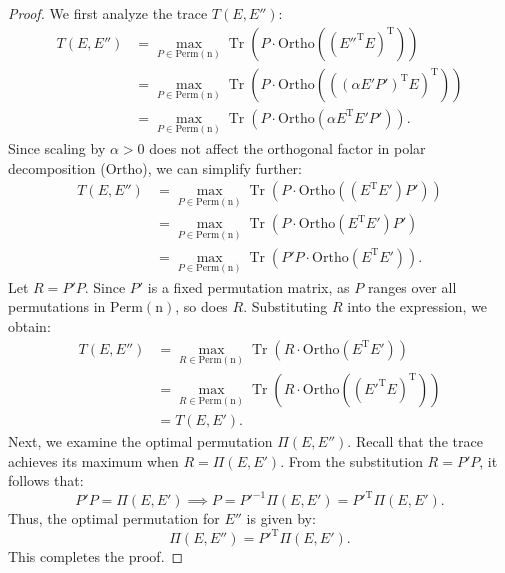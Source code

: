 \documentclass[10pt,a4paper]{amsart}
\DeclareMathOperator{\Tr}{Tr}
\begin{document}
\begin{proof}
We first analyze the trace $T(E, E'')$:
\[
\begin{aligned}
    T(E, E'') &= \max_{P \in \mathrm{Perm}(\mathrm{n})} \Tr\left(P \cdot \mathrm{Ortho}\left((E''^{\text{T}} E)^{\text{T}}\right)\right) \\
    &= \max_{P \in \mathrm{Perm}(\mathrm{n})} \Tr\left(P \cdot \mathrm{Ortho}\left(((\alpha E' P')^{\text{T}} E)^{\text{T}}\right)\right) \\
    &= \max_{P \in \mathrm{Perm}(\mathrm{n})} \Tr\left(P \cdot \mathrm{Ortho}\left(\alpha E^{\text{T}} E' P'\right)\right).
\end{aligned}
\]
Since scaling by $\alpha > 0$ does not affect the orthogonal factor in polar decomposition ($\mathrm{Ortho}$), we can simplify further:
\[
\begin{aligned}
    T(E, E'') &= \max_{P \in \mathrm{Perm}(\mathrm{n})} \Tr\left(P \cdot \mathrm{Ortho}\left((E^{\text{T}} E') P'\right)\right) \\
    &= \max_{P \in \mathrm{Perm}(\mathrm{n})} \Tr\left(P \cdot \mathrm{Ortho}(E^{\text{T}} E') P'\right) \\
    &= \max_{P \in \mathrm{Perm}(\mathrm{n})} \Tr\left(P' P \cdot \mathrm{Ortho}\left(E^{\text{T}} E'\right)\right).
\end{aligned}
\]
Let $R = P' P$. Since $P'$ is a fixed permutation matrix, as $P$ ranges over all permutations in $\mathrm{Perm}(\mathrm{n})$, so does $R$. Substituting $R$ into the expression, we obtain:
\[
\begin{aligned}
    T(E, E'') &= \max_{R \in \mathrm{Perm}(\mathrm{n})} \Tr\left(R \cdot \mathrm{Ortho}\left(E^{\text{T}} E'\right)\right) \\
    &= \max_{R \in \mathrm{Perm}(\mathrm{n})} \Tr\left(R \cdot \mathrm{Ortho}\left((E'^{\text{T}} E)^{\text{T}}\right)\right) \\
    &= T(E, E').
\end{aligned}
\]
Next, we examine the optimal permutation $\Pi(E, E'')$. Recall that the trace achieves its maximum when $R = \Pi(E, E')$. From the substitution $R = P' P$, it follows that:
\[
P' P = \Pi(E, E') \! \implies \! P = P'^{-1} \Pi(E, E') = P'^{\text{T}} \Pi(E, E').
\]
Thus, the optimal permutation for $E''$ is given by:
\[
\Pi(E, E'') = P'^{\text{T}} \Pi(E, E').
\]
This completes the proof.
\end{proof}
\end{document}
